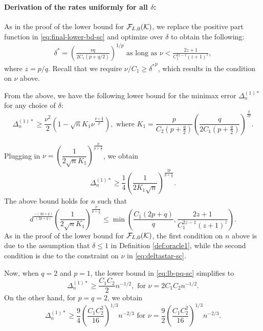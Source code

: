 \paragraph{Derivation of the rates uniformly for all $\delta$:}
As in the proof of the lower bound for $\mathcal{F}_{L,0}(\mathcal{K})$, we replace the positive part function in \eqref{eq:final-lower-bd-sc} and optimize over $\delta$ to obtain the following:
\begin{align}
\delta^*=\left(\frac{\nu q}{2C_1(p+q/2)}\right)^{1/p} \text{ as long as }\nu<\frac{2z+1}{C_1^{2z-1}(z+1)^z},
\label{eq:deltastar-sc}
\end{align}
where $z=p/q$. Recall that we require $\nu/C_1 \ge {\delta^*}^p$, which results in the condition on $\nu$ above.

From the above, we have the following lower bound for the minimax error $\Delta_n^{(1)*}$ for any choice of $\delta$:
\[
\Delta_n^{(1)*} \ge \dfrac{\nu^2}{2} \left(1 - \sqrt{n}  K_1 \nu^{\frac{p+\tfrac{q}{2}}{p}}\right), \text{ where } K_1 = \dfrac{p}{C_2(p+\tfrac{q}{2})} \left(\dfrac{q}{2C_1(p+\tfrac{q}{2})}\right)^{\frac{q}{2p}}.
\]


Plugging in $\nu = \left(\dfrac{1}{2\sqrt{n} K_1} \right)^{\frac{p}{p+\frac{q}{2}}}$, we obtain
\begin{align}
\Delta_n^{(1)*} \ge \dfrac{1}{4}\left(\dfrac{1}{2 K_1 \sqrt n}\right)^{\frac{2p}{p+\frac{q}{2}}}.
\label{eq:lb-pq-sc}
\end{align}
The above bound holds for $n$ such that 
$$\!d^{\frac{-(4p+q)}{(2p+q)}}\!\!\left(\frac{1}{2\sqrt{n} K_1} \right)^{\!\!\frac{p}{p+\frac{q}{2}}} \!\!\!\le \!\!\min\!\left( \frac{C_1 (2p+q)}{q}, \frac{2z+1}{C_1^{2z-1}(z+1)^z}\!\right).$$
As in the proof of the lower bound for $\mathcal{F}_{L,0}(\mathcal{K})$, the first condition on $n$ above is due to the assumption that $\delta \le 1$ in Definition \ref{def:oracle1}, while the second condition is due to the constraint on $\nu$ in \eqref{eq:deltastar-sc}.

Now, when $q=2$ and $p=1$, the lower bound in \eqref{eq:lb-pq-sc} simplifies to
\[
\Delta_n^{(1)*} \ge \dfrac{C_1 C_2}{2} n^{-1/2}, \text{ for } \nu = 2C_1C_2 n^{-1/2}.
\]
On the other hand, for $p=q=2$, we obtain
\[
\Delta_n^{(1)*} \ge  \frac{9}{4}\left(\frac{C_1 C_2^2}{16}\right)^{1/3} n^{-2/3} \text{ for } \nu=\frac{9}{2}\left(\frac{C_1 C_2^2}{16}\right)^{1/3}n^{-2/3}.
\]



